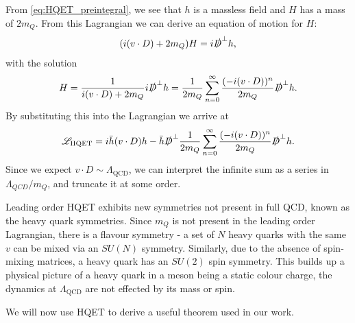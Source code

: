 From \eqref{eq:HQET_preintegral}, we see that $h$ is a massless field and $H$ has a mass of $2m_Q$. From this Lagrangian we can derive an equation of motion for $H$:
\begin{align}
  ( i(v\cdot D) + 2m_Q) H = i\slashed{D}^{\perp} h,
\end{align}
with the solution
\begin{align}
  H = {1\over i(v\cdot D) + 2m_Q} i\slashed{D}^{\perp} h = {1\over 2m_Q}\sum_{n=0}^{\infty} {(-i(v\cdot D))^n\over 2m_Q} \slashed{D}^{\perp} h.
\end{align}
By substituting this into the Lagrangian we arrive at
\begin{align}
  \mathscr{L}_{\text{HQET}} = i \bar{h} (v\cdot D) h - \bar{h} \slashed{D}^{\perp} {1\over 2m_Q}\sum_{n=0}^{\infty} {(-i(v\cdot D))^n\over 2m_Q} \slashed{D}^{\perp} h.
  \label{eq:HQET_lagrangian}
\end{align}
Since we expect $v\cdot D \sim \Lambda_{\text{QCD}}$, we can interpret the infinite sum as a series in $\Lambda_{QCD}/m_Q$, and truncate it at some order. %

Leading order HQET exhibits new symmetries not present in full QCD, known as the heavy quark symmetries. Since $m_Q$ is not present in the leading order Lagrangian, there is a flavour symmetry - a set of $N$ heavy quarks with the same $v$ can be mixed via an $SU(N)$ symmetry. Similarly, due to the absence of spin-mixing matrices, a heavy quark has an $SU(2)$ spin symmetry. This builds up a physical picture of a heavy quark in a meson being a static colour charge, the dynamics at $\Lambda_{\text{QCD}}$ are not effected by its mass or spin.

We will now use HQET to derive a useful theorem used in our work.


